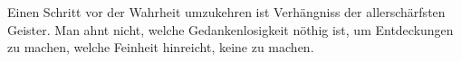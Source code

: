Einen Schritt vor der Wahrheit umzukehren ist Verhängniss der allerschärfsten Geister. Man ahnt nicht, welche Gedankenlosigkeit nöthig ist, um Entdeckungen zu machen, welche Feinheit hinreicht, keine zu machen.
\par

